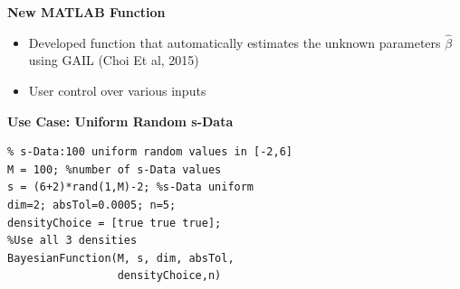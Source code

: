 \documentclass[final,mathserif]{beamer}
\newcommand{\blue}[1]{{\color{myblue}#1}}
\renewcommand{\blue}{\textcolor{blue!80!black}}
\begin{document}
\begin{frame}[fragile]
\begin{columns}[t]
\begin{column}{.31\linewidth}
\vspace{0.1in}

\begin{block}{\Large \textbf{\blue {New MATLAB Function}}}
\vspace{.1in}
\begin{itemize}

\item Developed  \alert{function}  that \alert{automatically} estimates the unknown parameters $\hat{\beta}$ using GAIL (Choi Et al, 2015)  

\item User control over various inputs

\end{itemize}
\end{block}

\vspace{0.1in}

\begin{block}{\Large \textbf{\blue {Use Case: Uniform Random s-Data}}}

\vspace{0.1in}    

\lstset{basicstyle=\small} 
\begin{lstlisting} 
% s-Data:100 uniform random values in [-2,6] 
M = 100; %number of s-Data values
s = (6+2)*rand(1,M)-2; %s-Data uniform
dim=2; absTol=0.0005; n=5;
densityChoice = [true true true]; 
%Use all 3 densities
BayesianFunction(M, s, dim, absTol, 
                 densityChoice,n)
\end{lstlisting}    

\begin{center}
\end{center}


\end{block}
\end{column}
\end{columns}
\end{frame}
\end{document}
